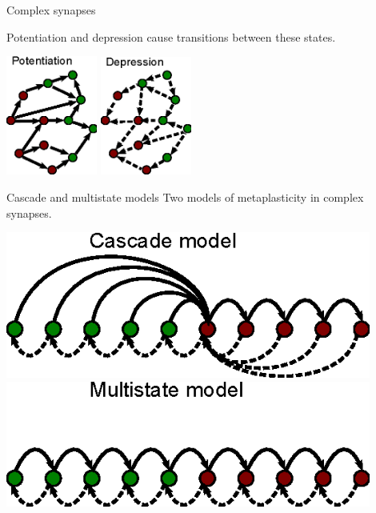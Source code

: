 \documentclass[final,hyperref={pdfpagelabels=false,bookmarks=false}]{beamer}
\begin{document}
\begin{frame}{}
\begin{columns}[t]
\begin{column}{0.32\linewidth}
\begin{block}{Complex synapses}
\vp
\parbox{22cm}{
 Potentiation and depression cause transitions between these states.
}
\hspace{3cm}
\parbox{11cm}{
 \includegraphics[width=3cm]{pot.eps}
 \hspace{2cm}
 \includegraphics[width=3cm]{dep.eps}
}
%
\end{block}


\begin{block}{Cascade and multistate models}
%
 Two models of metaplasticity in complex synapses.
 \begin{center}
 \parbox[t]{30cm}{
 \includegraphics[width=12cm]{cascade.eps}
 \hspace{2cm}
 \includegraphics[width=12cm]{multistate.eps}
 }
 \end{center}
 

\end{block}
\end{column}
\end{columns}
\end{frame}
\end{document}
